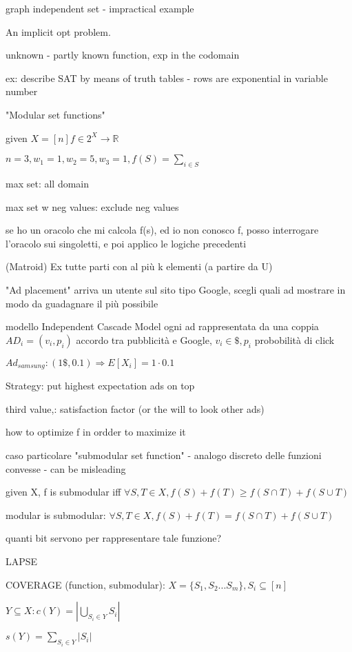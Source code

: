 \documentclass{report}
\begin{document}
	graph independent set - impractical example
	
	An implicit opt problem.
	
	unknown - partly known function, exp in the codomain
	
	ex: describe SAT by means of truth tables - rows are exponential in variable number
	
	"Modular set functions"
	
	given $X=[n] f \in 2^X \to \mathbb{R}$
	
	$n=3, w_1 = 1, w_2 = 5, w_3 = 1, f(S)=\sum_{i \in S}$
	
	max  set: all domain
	
	max set w neg values: exclude neg values
	
	se ho un oracolo che mi calcola f(s), ed io non conosco f, posso interrogare l'oracolo sui singoletti, e poi applico le logiche precedenti
	
	(Matroid) Ex tutte parti con al più k elementi (a partire da U)
	
	"Ad placement"
	arriva un utente sul sito tipo Google, scegli quali ad mostrare in modo da guadagnare il più possibile
	
	modello Independent Cascade Model
	ogni ad rappresentata da una coppia $AD_i = (v_i, p_i)$ accordo tra pubblicità e Google, $v_i \in \$, p_i$ probobilità di click
	
	$Ad_{samsung} : (1\$, 0.1) \Rightarrow E[X_i] = 1 \cdot 0.1$
	
	Strategy: put highest expectation ads on top
	
	third value,: satisfaction factor (or the will to look other ads)
	
	how to optimize f in ordder to maximize it
	
	caso particolare "submodular set function" - analogo discreto delle funzioni convesse - can be misleading
	
	given X, f is submodular iff $\forall S, T \in X, f(S)+f(T) \geq f(S\cap T) + f(S\cup T)$
	
	modular is submodular: $\forall S, T \in X, f(S)+f(T) = f(S\cap T) + f(S\cup T)$

	quanti bit servono per rappresentare tale funzione?
	
	LAPSE
	
	COVERAGE (function, submodular): $X=\{S_1, S_2...S_m\}, S_i \subseteq [n]$
	
	$Y\subseteq X : c(Y) = |\bigcup_{S_i \in Y}S_i|$
	
	
	$s(Y) = \sum_{S_i \in Y} |S_i|$
	
\end{document}

